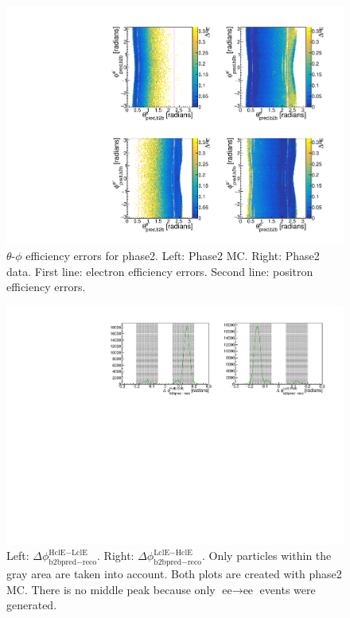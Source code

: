 \documentclass[a4paper,11pt,twosided,final,german,openbib,pdftex,listof=totoc,bibliography=totoc]{scrbook}
\begin{document}
\begin{appendix}
\begin{figure}[!htbp]
	\centering
	\includegraphics[width=\textwidth]{Plots/master/xCEffTP_MCData_Error.pdf}
	\caption[$\theta$-$\phi$ Efficiency Error Plots Phase2]{$\theta$-$\phi$ efficiency errors for phase2. Left: Phase2 MC. Right: Phase2 data. First line: electron efficiency errors. Second line: positron efficiency errors.}
	\label{plt:xCEff_Error}
\end{figure}







\begin{figure}[h!]
	\centering
	\includegraphics[width=\textwidth]{Plots/master/hb2b_MC.pdf}
	\caption[b2bClusterPhi - clusterPhi For Phase2 MC]{Left: $\Delta \phi _{\textrm{b2bpred} - \textrm{reco}}^{\textrm{HclE}-\textrm{LclE}}$. Right:  $\Delta \phi _{\textrm{b2bpred} - \textrm{reco}}^{\textrm{LclE}-\textrm{HclE}}$. Only particles within the gray area are taken into account. Both plots are created with phase2 MC. There is no middle peak because only $\textrm{ee} \rightarrow \textrm{ee}$ events were generated.}
	\label{fig:b2bMC2}
\end{figure}





\end{appendix}
\end{document}
